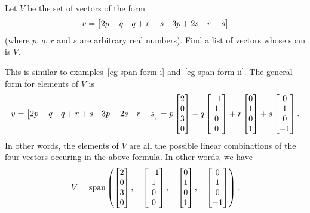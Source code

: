 \documentclass[a4paper]{amsart}
\renewenvironment{solution}{\SolutionInline}{\endSolutionInline}
\begin{document}
\begin{exercise}\label{ex-span-form-i}
 Let $V$ be the set of vectors of the form
 \[ v = \left[\begin{matrix} 2p-q  & q+r+s & 3p+2s & r-s \end{matrix}\right] \]
 (where $p$, $q$, $r$ and $s$ are arbitrary real numbers).  Find a
 list of vectors whose span is $V$.
\end{exercise}
\begin{solution}
 This is similar to examples~\ref{eg-span-form-i}
 and~\ref{eg-span-form-ii}.  The general form for elements of $V$ is 
 \[ v = \left[\begin{matrix} 2p-q  & q+r+s & 3p+2s & r-s \end{matrix}\right]
      = p \left[\begin{matrix}  2\\0\\3\\ 0 \end{matrix}\right] + 
        q \left[\begin{matrix} -1\\1\\0\\ 0 \end{matrix}\right] +
        r \left[\begin{matrix}  0\\1\\0\\ 1 \end{matrix}\right] +
        s \left[\begin{matrix}  0\\1\\0\\-1 \end{matrix}\right].
 \]
 In other words, the elements of $V$ are all the possible linear
 combinations of the four vectors occuring in the above formula.  In
 other words, we have 
 \[ V = \operatorname{span}\left(
        \left[\begin{matrix}  2\\0\\3\\ 0 \end{matrix}\right] ,\quad
        \left[\begin{matrix} -1\\1\\0\\ 0 \end{matrix}\right] ,\quad
        \left[\begin{matrix}  0\\1\\0\\ 1 \end{matrix}\right] ,\quad
        \left[\begin{matrix}  0\\1\\0\\-1 \end{matrix}\right] 
        \right).
 \]
\end{solution}
\end{document}
